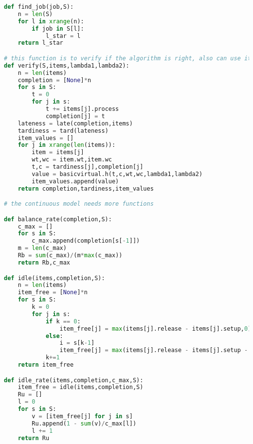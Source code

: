\begin{lstlisting}[language = Python]
def find_job(job,S):
	n = len(S)
	for l in xrange(n):
		if job in S[l]:
			l_star = l
	return l_star

# this function is to verify if the algorithm is right, also can use it to generate value in a silly way ^_^
def verify(S,items,lambda1,lambda2):
	n = len(items)
	completion = [None]*n
	for s in S:
		t = 0
		for j in s:
			t += items[j].process
			completion[j] = t
	lateness = late(completion,items)
	tardiness = tard(lateness)
	item_values = []
	for j in xrange(len(items)):
		item = items[j]
		wt,wc = item.wt,item.wc
		t,c = tardiness[j],completion[j]
		value = basicvirtual.h(t,c,wt,wc,lambda1,lambda2)
		item_values.append(value)
	return completion,tardiness,item_values

# the continuous model needs more functions

def balance_rate(completion,S):
	c_max = []
	for s in S:
		c_max.append(completion[s[-1]])
	m = len(c_max)
	Rb = sum(c_max)/(m*max(c_max))
	return Rb,c_max

def idle(items,completion,S):
	n = len(items)
	item_free = [None]*n
	for s in S:
		k = 0
		for j in s:
			if k == 0:
				item_free[j] = max(items[j].release - items[j].setup,0)
			else:
				i = s[k-1]
				item_free[j] = max(items[j].release - items[j].setup - completion[i] ,0)
			k+=1
	return item_free

def idle_rate(items,completion,c_max,S):
	item_free = idle(items,completion,S)
	Ru = []
	l = 0
	for s in S:
		v = [item_free[j] for j in s]
		Ru.append(1 - sum(v)/c_max[l])
		l += 1
	return Ru
\end{lstlisting}